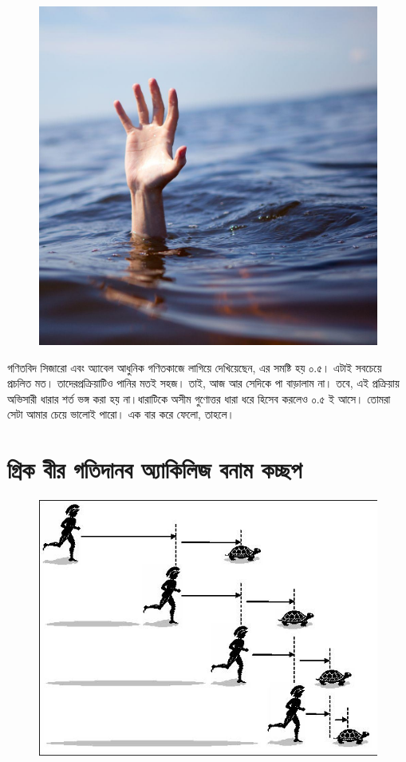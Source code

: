 \documentclass[
]{book}
\begin{document}
\begin{figure}

{\centering \includegraphics[width=0.8\linewidth]{img/drowning} 

}

\end{figure}

গণিতবিদ সিজারো এবং অ্যাবেল আধুনিক গণিতকাজে লাগিয়ে দেখিয়েছেন, এর সমষ্টি হয় ০.৫। এটাই সবচেয়ে প্রচলিত মত। তাদেরপ্রক্রিয়াটিও পানির মতই সহজ। তাই, আজ আর সেদিকে পা বাড়ালাম না। তবে, এই প্রক্রিয়ায় অভিসারী ধারার শর্ত ভঙ্গ করা হয় না।ধারাটিকে অসীম গুণোত্তর ধারা ধরে হিসেব করলেও ০.৫ ই আসে। তোমরা সেটা আমার চেয়ে ভালোই পারো। এক বার করে ফেলো, তাহলে।

\hypertarget{achilles-1}{%
\chapter{গ্রিক বীর গতিদানব অ্যাকিলিজ বনাম কচ্ছপ}\label{achilles-1}}

\begin{figure}

{\centering \includegraphics[width=0.8\linewidth]{img/achilles} 

}

\end{figure}
\end{document}
